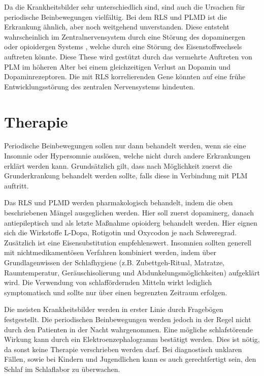 Da die Krankheitsbilder sehr unterschiedlich sind, sind auch die Ursachen für periodische Beinbewegungen vielfältig. Bei dem RLS und PLMD ist die Erkrankung ähnlich, aber noch weitgehend unverstanden. Diese entsteht wahrscheinlich im Zentralnervensystem durch eine Störung des dopaminergen oder opioidergen Systems \cite{1x1}, welche durch eine Störung des Eisenstoffwechsels auftreten könnte. Diese These wird gestützt durch das vermehrte Auftreten von PLM im höheren Alter bei einem gleichzeitigen Verlust an Dopamin und Dopaminrezeptoren. Die mit RLS korrelierenden Gene könnten auf eine frühe Entwicklungsstörung des zentralen Nervensystems hindeuten. \cite{PDS}

\section{Therapie}

Periodische Beinbewegungen sollen nur dann behandelt werden, wenn sie eine Insomnie oder Hypersomnie auslösen, welche nicht durch andere Erkrankungen erklärt werden kann. Grundsätzlich gilt, dass nach Möglichkeit zuerst die Grunderkrankung behandelt werden sollte, falls diese in Verbindung mit PLM auftritt. \cite{PDS}

Das RLS und PLMD werden pharmakologisch behandelt, indem die oben beschriebenen Mängel ausgeglichen werden. Hier soll zuerst dopaminerg, danach antiepileptisch und als letzte Maßnahme opioiderg behandelt werden. Hier eignen sich die Wirkstoffe L-Dopa, Rotigotin und Oxycodon je nach Schweregrad. Zusätzlich ist eine Eisensubstitution empfehlenswert. Insomnien sollten generell mit nichtmedikamentösen Verfahren kombiniert werden, indem über Grundlagenwissen der Schlafhygiene (z.B. Zubettgeh-Ritual, Matratze, Raumtemperatur, Geräuschisolierung und Abdunkelungsmöglichkeiten) aufgeklärt wird. Die Verwendung von schlaffördernden Mitteln wirkt lediglich symptomatisch und sollte nur über einen begrenzten Zeitraum erfolgen. \cite{1x1,PDS}

Die meisten Krankheitsbilder werden in erster Linie durch Fragebögen festgestellt. Die periodischen Beinbewegungen werden jedoch in der Regel nicht durch den Patienten in der Nacht wahrgenommen. Eine mögliche schlafstörende Wirkung kann durch ein Elektroenzephalogramm bestätigt werden. Dies ist nötig, da sonst keine Therapie verschrieben werden darf. Bei diagnostisch unklaren Fällen, sowie bei Kindern und Jugendlichen kann es auch gerechtfertigt sein, den Schlaf im Schlaflabor zu überwachen. \cite{1x1}


